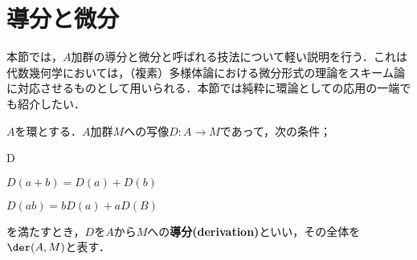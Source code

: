 %
%
%		

\section{導分と微分}

本節では，$A$加群の導分と微分と呼ばれる技法について軽い説明を行う．これは代数幾何学においては，（複素）多様体論における微分形式の理論をスキーム論に対応させるものとして用いられる．本節では純粋に環論としての応用の一端でも紹介したい．
\begin{defi}[導分]
	$A$を環とする．$A$加群$M$への写像$D:A\to M$であって，次の条件；
	\begin{defiterm}{D}
		\item $D(a+b)=D(a)+D(b)$
		\item $D(ab)=bD(a)+aD(B)$
	\end{defiterm}
	を満たすとき，$D$を$A$から$M$への\textbf{導分(derivation)}といい，その全体を$\der(A,M)$と表す．
\end{defi}

